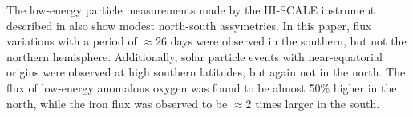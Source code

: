 The low-energy particle measurements made by the HI-SCALE instrument
described in \cite{Lanzerotti1996}
also show modest north-south assymetries. In this paper, flux variations
with a period of $\approx26$ days were observed in the southern, but not
the northern hemisphere. Additionally, solar particle events with
near-equatorial origins were observed at high southern latitudes, but
again not in the north. The flux of low-energy anomalous oxygen was
found to be almost 50\% higher in the north, while the iron flux was
observed to be $\approx2$ times larger in the south.
